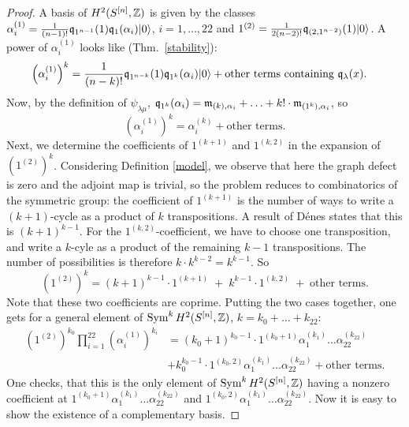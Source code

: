 \begin{proof}
A basis of $ H^{2}(S^{[n]},\mathbb{Z})$ is given by the classes $\alpha_i^{(1)}=\frac{1}{(n-1)!}\mathfrak{q}_{1^{n-1}}(1)\mathfrak{q}_1(\alpha_i)|0\rangle$, $i=1,\ldots ,22$ and $1^{(2)} =\frac{1}{2(n-2)!}\mathfrak{q}_{(2,1^{n-2})}(1)|0\rangle$.
A power of $\alpha_i^{(1)}$ looks like (Thm.~\ref{stability}):
\begin{align*}
\left(\alpha_i^{(1)}\right)^k & =\frac{1}{(n-k)!}\mathfrak{q}_{1^{n-k}}(1)\mathfrak{q}_{1^k}(\alpha_i)|0\rangle + \text{other terms containing } \mathfrak{q}_\lambda(x).
\end{align*}
Now, by the definition of $\psi_{\lambda\mu}$, $\mathfrak{q}_{1^k}(\alpha_i) = \mathfrak{m}_{(k),\alpha_i} + \ldots + k! \cdot\mathfrak{m}_{(1^k),\alpha_i}$, so
\begin{equation}
\left(\alpha_i^{(1)}\right)^k  = \alpha_i^{(k)} + \text{other terms}.
\end{equation}
Next, we determine the coefficients of $1^{(k+1)}$ and $1^{(k,2)}$ in the expansion of $\left(1^{(2)}\right)^k$. Considering Definition \ref{model}, we observe that here the graph defect is zero and the adjoint map is trivial, so the problem reduces to combinatorics of the symmetric group: the coefficient of $1^{(k+1)}$ is the number of ways to write a $(k+1)$-cycle as a product of $k$ transpositions. A result of D\'enes \cite{Denes} states that this is $(k\!+\!1)^{k-1}$. For the $1^{(k,2)}$-coefficient, we have to choose one transposition, and write a $k$-cyle as a product of the remaining $k-1$ transpositions. The number of possibilities is therefore $k\cdot k^{k-2} = k^{k-1}$. So
\begin{equation}
\left(1^{(2)}\right)^k = (k\!+\! 1)^{k-1} \cdot 1^{(k+1)} \;+\; k^{k-1}\cdot 1^{(k,2)} \;+\; \text{other terms}.
\end{equation}
Note that these two coefficients are coprime. 
Putting the two cases together, one gets for a general element of $\operatorname{Sym}^kH^2(S^{[n]},\mathbb{Z})$, $k=k_0+\ldots+k_{22}$:
\begin{align*}
\left(1^{(2)}\right)^{k_0}\prod_{i=1}^{22}\left(\alpha_i^{(1)}\right)^{k_i} &=  (k_0\!+\! 1)^{k_0-1} \cdot 1^{(k_0+1)}\alpha_1^{(k_1)}\ldots \alpha_{22}^{(k_{22})} \\
&+k_0^{k_0-1}\cdot 1^{(k_0,2)}\alpha_1^{(k_1)}\ldots \alpha_{22}^{(k_{22})} +\text{other terms}.
\end{align*}
One checks, that this is the only element of $\operatorname{Sym}^kH^2(S^{[n]},\mathbb{Z})$ having a nonzero coefficient at $1^{(k_0+1)}\alpha_1^{(k_1)}\ldots \alpha_{22}^{(k_{22})}$ and $1^{(k_0,2)}\alpha_1^{(k_1)}\ldots \alpha_{22}^{(k_{22})}$. Now it is easy to show the existence of a complementary basis.
\end{proof}




